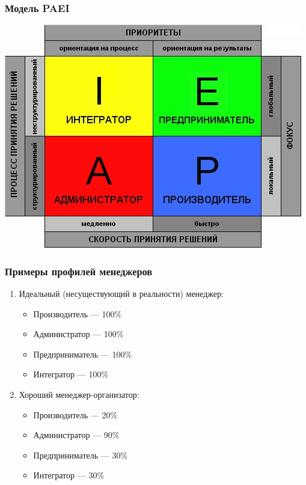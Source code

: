 \documentclass{../industrial-development}
\begin{document}
{\begin{frame} \frametitle{Модель PAEI}
{\includegraphics[width=0.95\linewidth]{paei.png}}
\end{frame}
\lecturenotes

\begin{frame} \frametitle{Примеры профилей менеджеров }
	\begin{enumerate}
\item Идеальный (несуществующий в реальности) менеджер: 
		 \begin{itemize}
                     \item Производитель — 100\%
 		 \item Администратор — 100\%
 		 \item Предприниматель — 100\%
		\item Интегратор — 100\%
		\end{itemize} 
\item Хороший менеджер-организатор:	
		 \begin{itemize}
                         \item Производитель — 20\%
 		 \item Администратор — 90\%
 		 \item Предприниматель — 30\%
		\item Интегратор — 30\%
		\end{itemize} 
\end{enumerate}
\end{frame}
\lecturenotes
~\cite{How_to_be_a_good_IT-manager}

}
\end{document}
